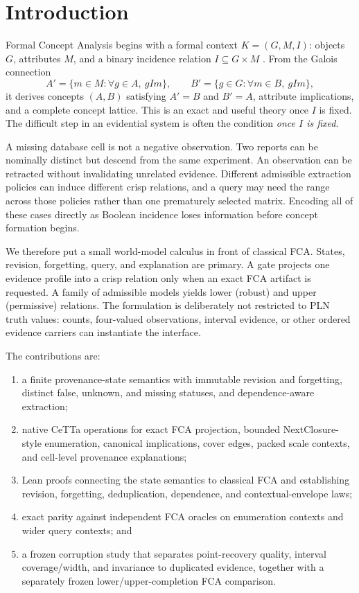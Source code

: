 \documentclass[11pt]{article}
\begin{document}
\section{Introduction}

Formal Concept Analysis begins with a formal context $K=(G,M,I)$: objects $G$,
attributes $M$, and a binary incidence relation $I\subseteq G\times M$
\cite{wille1982,ganterwille1999}. From the Galois connection
\[
  A'=\{m\in M:\forall g\in A,\ gIm\},\qquad
  B'=\{g\in G:\forall m\in B,\ gIm\},
\]
it derives concepts $(A,B)$ satisfying $A'=B$ and $B'=A$, attribute
implications, and a complete concept lattice. This is an exact and useful
theory once $I$ is fixed. The difficult step in an evidential system is often
the condition \emph{once $I$ is fixed}.

A missing database cell is not a negative observation. Two reports can be
nominally distinct but descend from the same experiment. An observation can be
retracted without invalidating unrelated evidence. Different admissible
extraction policies can induce different crisp relations, and a query may need
the range across those policies rather than one prematurely selected matrix.
Encoding all of these cases directly as Boolean incidence loses information
before concept formation begins.

We therefore put a small world-model calculus in front of classical FCA.
States, revision, forgetting, query, and explanation are primary. A gate
projects one evidence profile into a crisp relation only when an exact FCA
artifact is requested. A family of admissible models yields lower (robust) and
upper (permissive) relations. The formulation is deliberately not restricted
to PLN truth values: counts, four-valued observations, interval evidence, or
other ordered evidence carriers can instantiate the interface.

The contributions are:
\begin{enumerate}
  \item a finite provenance-state semantics with immutable revision and
        forgetting, distinct false, unknown, and missing statuses, and
        dependence-aware extraction;
  \item native CeTTa operations for exact FCA projection, bounded
        NextClosure-style enumeration, canonical implications, cover edges,
        packed scale contexts, and cell-level provenance explanations;
  \item Lean proofs connecting the state semantics to classical FCA and
        establishing revision, forgetting, deduplication, dependence, and
        contextual-envelope laws;
  \item exact parity against independent FCA oracles on
        \WMFCAExactContextCount{} enumeration contexts and
        \WMFCAQueryContextCount{} wider query contexts; and
  \item a frozen corruption study that separates point-recovery quality,
        interval coverage/width, and invariance to duplicated evidence,
        together with a separately frozen lower/upper-completion FCA
        comparison.
\end{enumerate}
\end{document}
